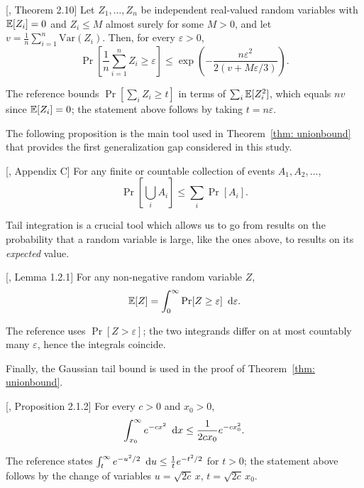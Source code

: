 \documentclass[reqno]{amsart}
\begin{document}
\begin{theorem}\label{app: bernstein} [\cite{boucheron2013concentration}, Theorem 2.10]
  Let $Z_1,\ldots,Z_n$ be independent real-valued random variables with $\mathbb{E}[Z_i]=0$ and $Z_i\le M$ almost surely for some $M>0$, and let $v = \frac1n\sum_{i=1}^n \mathrm{Var}(Z_i)$. Then, for every $\varepsilon>0$,
  \[
  \Pr\left[\frac1n\sum_{i=1}^n Z_i \ge \varepsilon\right] \le \exp\left(-\frac{n\varepsilon^2}{2(v + M\varepsilon/3)}\right).
  \]
\end{theorem}
The reference bounds $\Pr[\sum_i Z_i\ge t]$ in terms of $\sum_i\mathbb{E}[Z_i^2]$, which equals $nv$ since $\mathbb{E}[Z_i]=0$; the statement above follows by taking $t=n\varepsilon$.

The following proposition is the main tool used in Theorem~\ref{thm: unionbound} that provides the first generalization gap considered in this study. 

\begin{proposition}\label{app: unionbound} [\cite{mohri2018foundations}, Appendix C]
  For any finite or countable collection of events $A_1, A_2, \ldots$,
  \[
  \Pr\left[\bigcup_i A_i\right] \le \sum_i \Pr[A_i].
  \]
\end{proposition}

Tail integration is a crucial tool which allows us to go from results on the probability that a random variable is large, like the ones above, to results on its {\it expected\/} value. 

\begin{proposition}\label{app: tail int} [\cite{vershynin2018high}, Lemma 1.2.1]
  For any non-negative random variable $Z$,
  \[
  \mathbb{E}[Z] = \int_0^\infty \Pr[Z\ge \varepsilon] \mathop{}\!\,\,\mathrm{d} \varepsilon.
  \]
\end{proposition}
The reference uses $\Pr[Z>\varepsilon]$; the two integrands differ on at most countably many $\varepsilon$, hence the integrals coincide.

Finally, the Gaussian tail bound is used in the proof of Theorem~\ref{thm: unionbound}. 

\begin{proposition}\label{app: gtailbound} [\cite{vershynin2018high}, Proposition 2.1.2]
  For every $c>0$ and $x_0>0$,
  \[
  \int_{x_0}^\infty e^{-cx^2}\mathop{}\!\,\,\mathrm{d} x \le \frac{1}{2cx_0}e^{-cx_0^2}.
  \]
\end{proposition}
The reference states $\int_{t}^\infty e^{-u^2/2}\mathop{}\!\,\,\mathrm{d} u\le \frac1t e^{-t^2/2}$ for $t>0$; the statement above follows by the change of variables $u=\sqrt{2c}\,x$, $t=\sqrt{2c}\,x_0$.
\end{document}
